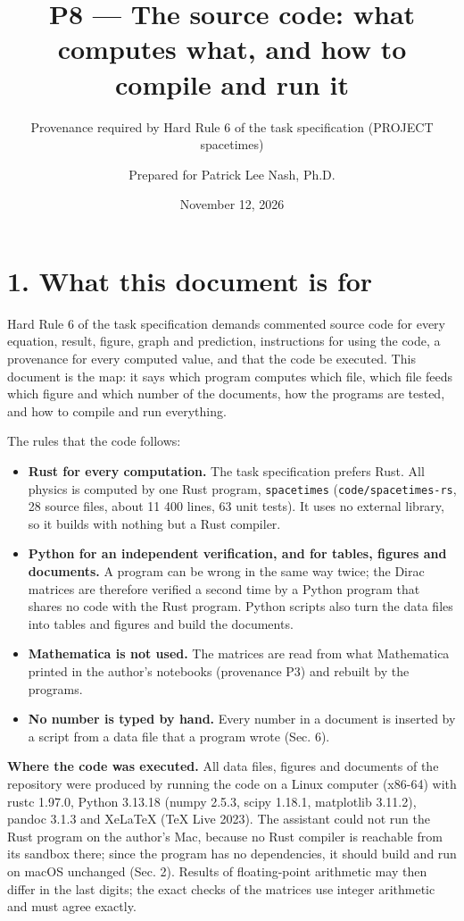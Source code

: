 \documentclass[
  10pt,
]{article}
\title{P8 --- The source code: what computes what, and how to compile
and run it}
\subtitle{Provenance required by Hard Rule 6 of the task specification
(PROJECT spacetimes)}
\author{Prepared for Patrick Lee Nash, Ph.D.}
\date{November 12, 2026}
\providecommand{\tightlist}{%
  \setlength{\itemsep}{0pt}\setlength{\parskip}{0pt}}
\begin{document}
\maketitle

\hypertarget{what-this-document-is-for}{%
\section{1. What this document is for}\label{what-this-document-is-for}}

Hard Rule 6 of the task specification demands commented source code for
every equation, result, figure, graph and prediction, instructions for
using the code, a provenance for every computed value, and that the code
be executed. This document is the map: it says which program computes
which file, which file feeds which figure and which number of the
documents, how the programs are tested, and how to compile and run
everything.

The rules that the code follows:

\begin{itemize}
\tightlist
\item
  \textbf{Rust for every computation.} The task specification prefers
  Rust. All physics is computed by one Rust program, \texttt{spacetimes}
  (\texttt{code/spacetimes-rs}, 28 source files, about 11 400 lines, 63
  unit tests). It uses no external library, so it builds with nothing
  but a Rust compiler.
\item
  \textbf{Python for an independent verification, and for tables,
  figures and documents.} A program can be wrong in the same way twice;
  the Dirac matrices are therefore verified a second time by a Python
  program that shares no code with the Rust program. Python scripts also
  turn the data files into tables and figures and build the documents.
\item
  \textbf{Mathematica is not used.} The matrices are read from what
  Mathematica printed in the author's notebooks (provenance P3) and
  rebuilt by the programs.
\item
  \textbf{No number is typed by hand.} Every number in a document is
  inserted by a script from a data file that a program wrote (Sec. 6).
\end{itemize}

\textbf{Where the code was executed.} All data files, figures and
documents of the repository were produced by running the code on a Linux
computer (x86-64) with rustc 1.97.0, Python 3.13.18 (numpy 2.5.3, scipy
1.18.1, matplotlib 3.11.2), pandoc 3.1.3 and XeLaTeX (TeX Live 2023).
The assistant could not run the Rust program on the author's Mac,
because no Rust compiler is reachable from its sandbox there; since the
program has no dependencies, it should build and run on macOS unchanged
(Sec. 2). Results of floating-point arithmetic may then differ in the
last digits; the exact checks of the matrices use integer arithmetic and
must agree exactly.
\end{document}
